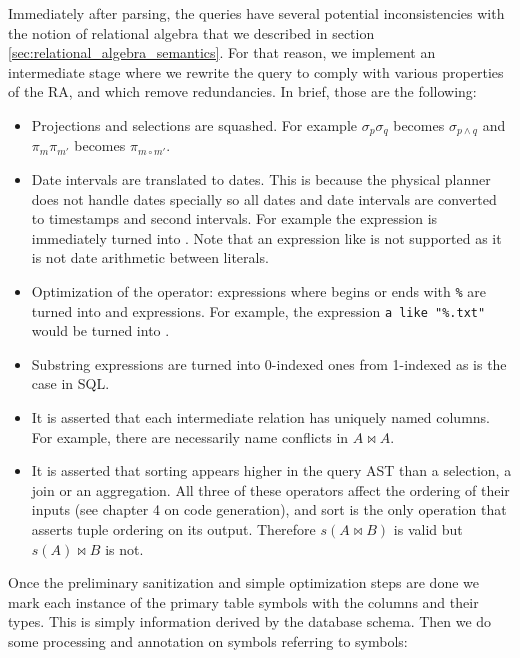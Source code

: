 Immediately after parsing, the queries have several potential
inconsistencies with the notion of relational algebra that we
described in section \ref{sec:relational_algebra_semantics}.
For that reason, we implement an intermediate stage
where we rewrite the query to comply with various properties of the
RA, and which remove redundancies. In brief, those are the following:

\begin{itemize}
\item Projections and selections are squashed. For example
  \(\sigma_p\sigma_q\) becomes \(\sigma_{p \land q}\) and \(\pi_m
  \pi_{m'}\) becomes \(\pi_{m \circ m'}\).
\item Date intervals are translated to dates. This is because the
  physical planner does not handle dates specially so all dates and
  date intervals are converted to timestamps and second intervals. For
  example the expression  is
  immediately turned into . Note that an
  expression like  is not
  supported as it is not date arithmetic between literals.
\item Optimization of the  operator:  expressions where  begins
  or ends with \texttt{\%} are turned into  and
   expressions. For example, the expression \texttt{a
    like "\%.txt"} would be turned into .
\item Substring expressions are turned into 0-indexed ones from
  1-indexed as is the case in SQL.
\item It is asserted that each intermediate relation has uniquely
  named columns. For example, there are necessarily name conflicts in
  \(A \Join A\).
\item It is asserted that sorting appears higher in the query AST than a
  selection, a join or an aggregation. All three of these operators
  affect the ordering of their inputs (see chapter 4 on code
  generation), and sort is the only operation that asserts tuple
  ordering on its output. Therefore \(s(A \Join B)\) is valid but
  \(s(A) \Join B\) is not.
\end{itemize}

Once the preliminary sanitization and simple optimization steps are
done we mark each instance of the primary table symbols with the
columns and their types. This is simply information derived by the
database schema. Then we do some processing and annotation on symbols
referring to symbols:

